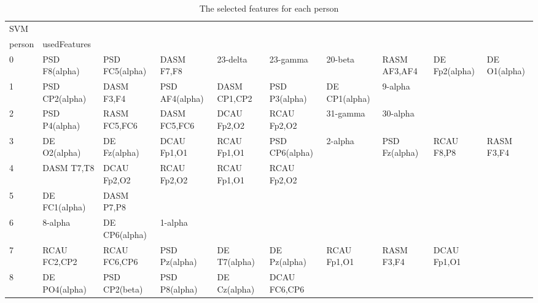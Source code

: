 \begin{landscape}
\begin{table}[]
\centering
\caption{The selected features for each person}
\begin{tabular}{l|llllllll}
SVM      &                &                &                &                &                &                &               &                &               &               \\
person   & usedFeatures   &                &                &                &                &                &               &                &               &               \\
0        & PSD F8(alpha)  & PSD FC5(alpha) & DASM F7,F8     & 23-delta       & 23-gamma       & 20-beta        & RASM AF3,AF4  & DE Fp2(alpha)  & DE O1(alpha)  &               \\
1        & PSD CP2(alpha) & DASM F3,F4     & PSD AF4(alpha) & DASM CP1,CP2   & PSD P3(alpha)  & DE CP1(alpha)  & 9-alpha       &                &               &               \\
2        & PSD P4(alpha)  & RASM FC5,FC6   & DASM FC5,FC6   & DCAU Fp2,O2    & RCAU Fp2,O2    & 31-gamma       & 30-alpha      &                &               &               \\
3        & DE O2(alpha)   & DE Fz(alpha)   & DCAU Fp1,O1    & RCAU Fp1,O1    & PSD CP6(alpha) & 2-alpha        & PSD Fz(alpha) & RCAU F8,P8     & RASM F3,F4    &               \\
4        & DASM T7,T8     & DCAU Fp2,O2    & RCAU Fp2,O2    & RCAU Fp1,O1    & RCAU Fp2,O2    &                &               &                &               &               \\
5        & DE FC1(alpha)  & DASM P7,P8     &                &                &                &                &               &                &               &               \\
6        & 8-alpha        & DE CP6(alpha)  & 1-alpha        &                &                &                &               &                &               &               \\
7        & RCAU FC2,CP2   & RCAU FC6,CP6   & PSD Pz(alpha)  & DE T7(alpha)   & DE Pz(alpha)   & RCAU Fp1,O1    & RASM F3,F4    & DCAU Fp1,O1    &               &               \\
8        & DE PO4(alpha)  & PSD CP2(beta)  & PSD P8(alpha)  & DE Cz(alpha)   & DCAU FC6,CP6   &                &               &                &               &               \\

\end{tabular}
\end{table}
\end{landscape}
